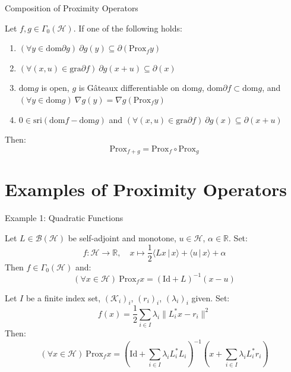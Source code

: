 \documentclass[aspectratio=169,10pt]{beamer}
\begin{document}
\begin{frame}{Composition of Proximity Operators}
\begin{theorem}
Let $f, g \in \Gamma_0(\mathcal{H})$. If one of the following holds:
\begin{enumerate}
    \item $(\forall y \in \mathrm{dom} \partial g)\ \partial g(y) \subseteq \partial(\mathrm{Prox}_f y)$
    \item $(\forall (x,u) \in \mathrm{gra} \partial f)\ \partial g(x + u) \subseteq \partial(x)$
    \item $\mathrm{dom} g$ is open, $g$ is Gâteaux differentiable on $\mathrm{dom} g$, $\mathrm{dom} \partial f \subset \mathrm{dom} g$, and $(\forall y \in \mathrm{dom} g)\ \nabla g(y) = \nabla g(\mathrm{Prox}_f y)$
    \item $0 \in \mathrm{sri}(\mathrm{dom} f - \mathrm{dom} g)$ and $(\forall (x,u) \in \mathrm{gra} \partial f)\ \partial g(x) \subseteq \partial(x + u)$
\end{enumerate}
Then:
\[
\mathrm{Prox}_{f+g} = \mathrm{Prox}_f \circ \mathrm{Prox}_g
\]
\end{theorem}
\end{frame}

\section{Examples of Proximity Operators}

\begin{frame}{Example 1: Quadratic Functions}
\begin{example}
Let $L \in \mathcal{B}(\mathcal{H})$ be self-adjoint and monotone, $u \in \mathcal{H}$, $\alpha \in \mathbb{R}$. Set:
\[
f: \mathcal{H} \to \mathbb{R}, \quad x \mapsto \frac{1}{2}\langle Lx \,|\, x \rangle + \langle u \,|\, x \rangle + \alpha
\]
Then $f \in \Gamma_0(\mathcal{H})$ and:
\[
(\forall x \in \mathcal{H})\ \mathrm{Prox}_f x = \left(\mathrm{Id} + L\right)^{-1}(x - u)
\]
\end{example}

\vspace{0.3cm}

\begin{example}
Let $I$ be a finite index set, $(\mathcal{K}_i)_i$, $(r_i)_i$, $(\lambda_i)_i$ given. Set:
\[
f(x) = \frac{1}{2}\sum_{i \in I} \lambda_i \|L_i^* x - r_i\|^2
\]
Then:
\[
(\forall x \in \mathcal{H})\ \mathrm{Prox}_f x = \left(\mathrm{Id} + \sum_{i \in I} \lambda_i L_i^* L_i\right)^{-1}\left(x + \sum_{i \in I} \lambda_i L_i^* r_i\right)
\]
\end{example}
\end{frame}
\end{document}
